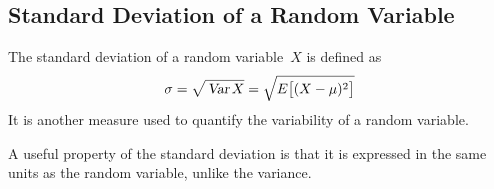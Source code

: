 \subsection{Standard Deviation of a Random Variable}
The standard deviation of a random variable~$X$ is defined as
\[
    \sigma = \sqrt{\mathstrut\operatorname{\textsl{Var}} X} 
    = \sqrt{\mathstrut E\bigl[(X - \mu)^2\bigr]}
\]
It is another measure used to quantify the variability of a random variable.
\begin{info}
A useful property of the standard deviation is that it is expressed in the same units as the random variable, unlike the variance.
\end{info}